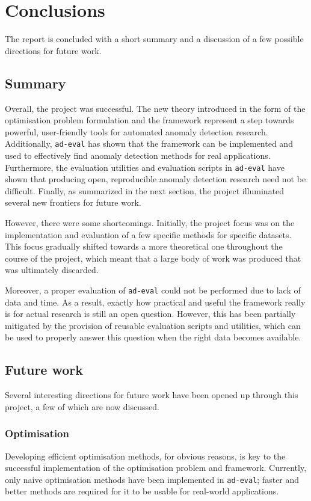 \chapter{Conclusions}
\label{ch:conclusions}

The report is concluded with a short summary and a discussion of a few possible directions for future work.

\section{Summary}

Overall, the project was successful. The new theory introduced in the form of the optimisation problem formulation and the framework represent a step towards powerful, user-friendly tools for automated anomaly detection research. Additionally, \texttt{ad-eval} has shown that the framework can be implemented and used to effectively find anomaly detection methods for real applications. Furthermore, the evaluation utilities and evaluation scripts in \texttt{ad-eval} have shown that producing open, reproducible anomaly detection research need not be difficult. Finally, as summarized in the next section, the project illuminated several new frontiers for future work.

However, there were some shortcomings. Initially, the project focus was on the implementation and evaluation of a few specific methods for specific datasets. This focus gradually shifted towards a more theoretical one throughout the course of the project, which meant that a large body of work was produced that was ultimately discarded.

Moreover, a proper evaluation of \texttt{ad-eval} could not be performed due to lack of data and time. As a result, exactly how practical and useful the framework really is for actual research is still an open question. However, this has been partially mitigated by the provision of reusable evaluation scripts and utilities, which can be used to properly answer this question when the right data becomes available.

\section{Future work}
Several interesting directions for future work have been opened up through this project, a few of which are now discussed.

\subsection{Optimisation}
Developing efficient optimisation methods, for obvious reasons, is key to the successful implementation of the optimisation problem and framework. Currently, only naive optimisation methods have been implemented in \texttt{ad-eval}; faster and better methods are required for it to be usable for real-world applications.

